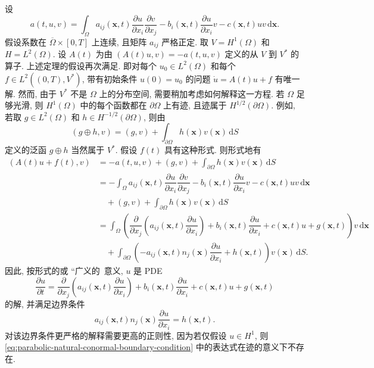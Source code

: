 \begin{Example}
\label{ex:parabolic-natural-boundary-problem}
设
\begin{equation}\label{eq:parabolic-natural-boundary-quadratic-form}
a(t,u,v)=\int_\Omega a_{ij}(\bm{x},t)\dfrac{\partial u}{\partial x_i}\dfrac{\partial v}{\partial x_j}-b_i(\bm{x},t)\dfrac{\partial u}{\partial x_i}v-c(\bm{x},t)uv\,\mathrm{d}\bm{x}.
\end{equation}
假设系数在 $\overline\Omega\times[0,T]$ 上连续, 且矩阵 $a_{ij}$ 严格正定. 取 $V=H^1(\Omega)$ 和 $H=L^2(\Omega)$. 设 $A(t)$ 为由 $(A(t)u,v)=-a(t,u,v)$ 定义的从 $V$ 到 $V^*$ 的算子. 上述定理的假设再次满足. 即对每个 $u_0\in L^2(\Omega)$ 和每个 $f\in L^2((0,T),V^*)$, 带有初始条件 $u(0)=u_0$ 的问题 $\dot u=A(t)u+f$ 有唯一解. 然而, 由于 $V^*$ 不是 $\Omega$ 上的分布空间, 需要稍加考虑如何解释这一方程. 若 $\Omega$ 足够光滑, 则 $H^1(\Omega)$ 中的每个函数都在 $\partial\Omega$ 上有迹, 且迹属于 $H^{1/2}(\partial\Omega)$. 例如, 若取 $g\in L^2(\Omega)$ 和 $h\in H^{-1/2}(\partial\Omega)$, 则由
\begin{equation}\label{eq:parabolic-natural-boundary-sum-functional}
(g\oplus h,v)=(g,v)+\int_{\partial\Omega}h(\bm{x})v(\bm{x})\,\mathrm{d}S
\end{equation}
定义的泛函 $g\oplus h$ 当然属于 $V^*$. 假设 $f(t)$ 具有这种形式. 则形式地有\[\begin{aligned}
(A(t)u+f(t),v)&=-a(t,u,v)+(g,v)+\int_{\partial\Omega}h(\bm{x})v(\bm{x})\,\mathrm{d}S\\
&=-\int_\Omega a_{ij}(\bm{x},t)\dfrac{\partial u}{\partial x_i}\dfrac{\partial v}{\partial x_j}-b_i(\bm{x},t)\dfrac{\partial u}{\partial x_i}v-c(\bm{x},t)uv\,\mathrm{d}\bm{x}\\
&\quad+(g,v)+\int_{\partial\Omega}h(\bm{x})v(\bm{x})\,\mathrm{d}S\\
&=\int_\Omega\left(\dfrac{\partial}{\partial x_j}\left(a_{ij}(\bm{x},t)\dfrac{\partial u}{\partial x_i}\right)+b_i(\bm{x},t)\dfrac{\partial u}{\partial x_i}+c(\bm{x},t)u+g(\bm{x},t)\right)v\,\mathrm{d}\bm{x}\\
&\quad+\int_{\partial\Omega}\left(-a_{ij}(\bm{x},t)n_j(\bm{x})\dfrac{\partial u}{\partial x_i}+h(\bm{x},t)\right)v(\bm{x})\,\mathrm{d}S.
\end{aligned}\]因此, 按形式的或 ``广义的\textquotesingle\textquotesingle\ 意义, $u$ 是 PDE
\begin{equation}\label{eq:parabolic-natural-boundary-interior-equation}
\dfrac{\partial u}{\partial t}=\dfrac{\partial}{\partial x_j}\left(a_{ij}(\bm{x},t)\dfrac{\partial u}{\partial x_i}\right)+b_i(\bm{x},t)\dfrac{\partial u}{\partial x_i}+c(\bm{x},t)u+g(\bm{x},t)
\end{equation}
的解, 并满足边界条件
\begin{equation}\label{eq:parabolic-natural-conormal-boundary-condition}
a_{ij}(\bm{x},t)n_j(\bm{x})\dfrac{\partial u}{\partial x_i}=h(\bm{x},t).
\end{equation}
对该边界条件更严格的解释需要更高的正则性, 因为若仅假设 $u\in H^1$, 则 \eqref{eq:parabolic-natural-conormal-boundary-condition} 中的表达式在迹的意义下不存在.
\end{Example}

